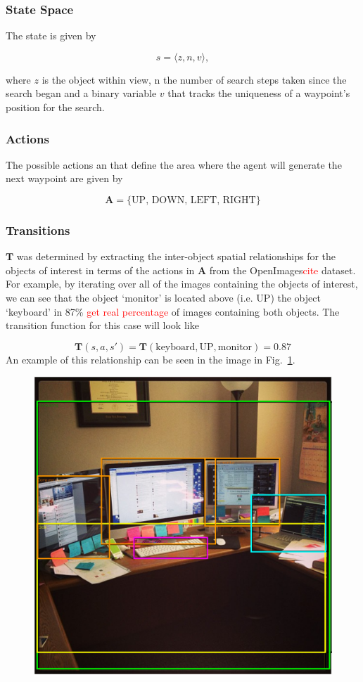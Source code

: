 \documentclass[runningheads]{llncs}
\newcommand\todo[1]{\textcolor{red}{#1}}
\begin{document}
\subsubsection{State Space}

The state is given by

\begin{equation}
  s = \langle z, n, v \rangle,
\end{equation}

\noindent where $z$ is the object within view, n the number of search steps taken since the search began and a binary variable $v$ that tracks the uniqueness of a waypoint's position for the search.

\subsubsection{Actions}

The possible actions an that define the area where the agent will generate the next waypoint are given by

\begin{equation}
  \mathbf{A} = \{ \textrm{UP, DOWN, LEFT, RIGHT} \}
\end{equation}

\subsubsection{Transitions}

$\mathbf{T}$ was determined by extracting the inter-object spatial relationships for the objects of interest in terms of the actions in $\mathbf{A}$ from the OpenImages\todo{cite} dataset. 
For example, by iterating over all of the images containing the objects of interest, we can see that the object `monitor' is located above (i.e. UP) the object `keyboard' in 87\% \todo{get real percentage} of images containing both objects. 
The transition function for this case will look like 

\begin{equation}
  \mathbf{T}(s, a, s') = \mathbf{T}(\textrm{keyboard}, \textrm{UP}, \textrm{monitor}) = 0.87
\end{equation}
An example of this relationship can be seen in the image in Fig.~\ref{fig:openimage}.

\begin{figure}
  \centering
  \includegraphics[width=0.5\columnwidth]{figures/desk_example.png}
  \caption{}\label{fig:openimage}
\end{figure}
\end{document}

